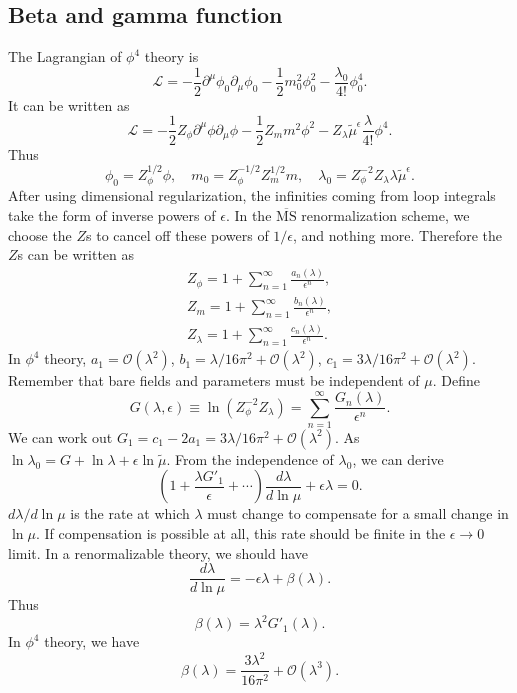 \subsection{Beta and gamma function}
\noindent
The Lagrangian of $\phi^4$ theory is 
\[\mathcal{L} = -\frac{1}{2} \partial^{\mu} \phi_0 \partial_{\mu} \phi_0 -\frac{1}{2}m_0^2 \phi_0^2 - \frac{\lambda_0}{4!}\phi_0^4.\]
It can be written as
\[\mathcal{L} = -\frac{1}{2}Z_{\phi} \partial^{\mu} \phi \partial_{\mu} \phi -\frac{1}{2}Z_{m}m^2 \phi^2 - Z_{\lambda} \tilde{\mu}^{\epsilon}\frac{\lambda}{4!}\phi^4.\]
Thus
\[\phi_0 = Z_{\phi}^{1/2}\phi , \quad m_0 = Z_{\phi}^{-1/2} Z_{m}^{1/2}m , \quad \lambda_0 = Z_{\phi}^{-2} Z_{\lambda} \lambda \tilde{\mu}^{\epsilon}.\]
After using dimensional regularization, the infinities coming from loop integrals take the form of inverse powers of $\epsilon$. In the  $\mathrm{\overline{MS}}$ renormalization scheme, we choose the $Z$s to cancel off these powers of $1/\epsilon$, and nothing more. Therefore the $Z$s can be written as
\begin{eqnarray}
Z_{\phi} = 1 + \sum_{n=1}^{\infty} \frac{a_n(\lambda)}{\epsilon^n} ,\nonumber \\
Z_{m} = 1 + \sum_{n=1}^{\infty} \frac{b_n(\lambda)}{\epsilon^n} ,\nonumber \\
Z_{\lambda} = 1 + \sum_{n=1}^{\infty} \frac{c_n(\lambda)}{\epsilon^n} .\nonumber 
\end{eqnarray}
In $\phi^4$ theory, $a_1 = \mathcal{O}(\lambda^2)$, $b_1 = {\lambda}/{16\pi^2} +  \mathcal{O}(\lambda^2)$, $c_1 = {3\lambda}/{16\pi^2} + \mathcal{O}(\lambda^2)$.
Remember that bare fields and parameters must be independent of $\mu$. 
Define
\[G(\lambda,\epsilon) \equiv \ln(Z_{\phi}^{-2} Z_{\lambda}) = \sum_{n=1}^{\infty} \frac{G_n(\lambda)}{\epsilon^n}.\]
We can work out $G_1 = c_1 - 2a_1 = {3\lambda}/{16\pi^2} + \mathcal{O}(\lambda^2)$.
As $\ln \lambda_0 = G + \ln \lambda + \epsilon \ln \tilde{\mu} $. 
From the independence of $\lambda_0$, we can derive
\[\left ( 1 + \frac{\lambda G'_1}{\epsilon} + \cdots \right) \frac{d\lambda}{d\ln \mu} + \epsilon \lambda = 0.\]
${d\lambda}/{d\ln\mu}$ is the rate at which $\lambda$ must change to compensate for a small change in $\ln \mu$. 
If compensation is possible at all, this rate should be finite in the $\epsilon \to 0$ limit. 
In a renormalizable theory, we should have
\[\frac{d\lambda}{d\ln\mu} = -\epsilon\lambda + \beta(\lambda).\]
Thus
\[\beta(\lambda) = \lambda^2 G'_1(\lambda).\]
In $\phi^4$ theory, we have
\[\beta(\lambda) = \frac{3\lambda^2}{16\pi^2} + \mathcal{O}(\lambda^3).\]
